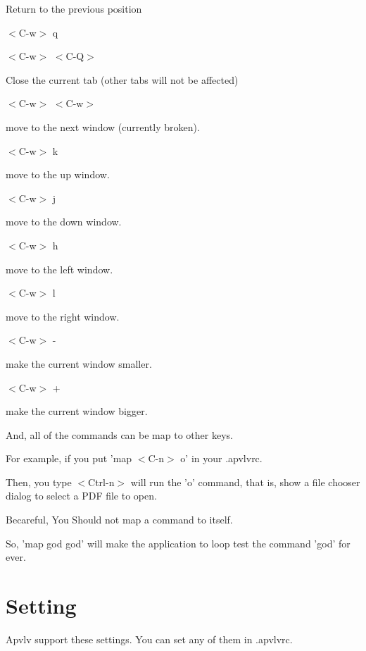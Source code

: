 \documentclass[a4paper,12pt]{article}
\newcommand{\apvlv}{\textsf{Apvlv{ }}}
\begin{document}
\begin{description}
Return to the previous position

\item $<$C-w$>$ q
\item $<$C-w$>$ $<$C-Q$>$

Close the current tab (other tabs will not be affected)

\item $<$C-w$>$ $<$C-w$>$

move to the next window (currently broken).

\item $<$C-w$>$ k

move to the up window.

\item $<$C-w$>$ j

move to the down window.

\item $<$C-w$>$ h

move to the left window.

\item $<$C-w$>$ l

move to the right window.

\item $<$C-w$>$ -

make the current window smaller.

\item $<$C-w$>$ +

make the current window bigger.

\end{description}

And, all of the commands can be map to other keys.

For example, if you put 
'map $<$C-n$>$ o'
in your .apvlvrc.

Then, you type $<$Ctrl-n$>$ will run the 'o' command, that is, show a file chooser dialog to select a PDF file to open.

Becareful, You Should not map a command to itself.

So, 'map god god' will make the application to loop test the command 'god' for ever.

\newpage

\section{Setting}\label{setting}

\apvlv support these settings. You can set any of them in .apvlvrc.
\end{document}
